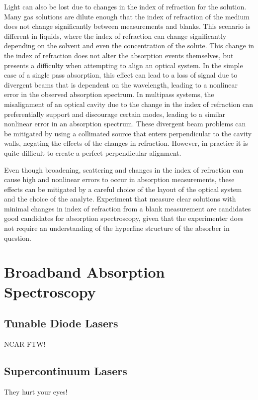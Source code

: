 Light can also be lost due to changes in the index of refraction for the
solution. Many gas solutions are dilute enough that the index of refraction of
the medium does not change significantly between measurements and blanks. This
scenario is different in liquids, where the index of refraction can change
significantly depending on the solvent and even the concentration of the
solute. This change in the index of refraction does not alter the absorption
events themselves, but presents a difficulty when attempting to align an
optical system. In the simple case of a single pass absorption, this effect can
lead to a loss of signal due to divergent beams that is dependent on the
wavelength, leading to a nonlinear error in the observed absorption spectrum.
In multipass systems, the misalignment of an optical cavity due to the change
in the index of refraction can preferentially support and discourage certain
modes, leading to a similar nonlinear error in an absorption spectrum. These
divergent beam problems can be mitigated by using a collimated source that
enters perpendicular to the cavity walls, negating the effects of the changes
in refraction. However, in practice it is quite difficult to create a perfect
perpendicular alignment.

Even though broadening, scattering and changes in the index of refraction
can cause high and nonlinear errors to occur in absorption measurements,
these effects can be mitigated by a careful choice of the layout of the
optical system and the choice of the analyte. Experiment that measure clear
solutions with minimal changes in index of refraction from a blank measurement
are candidates good candidates for absorption spectroscopy, given that the
experimenter does not require an understanding of the hyperfine structure of
the absorber in question.

\section{Broadband Absorption Spectroscopy}


\subsection{Tunable Diode Lasers}
NCAR FTW!

\subsection{Supercontinuum Lasers}
They hurt your eyes!

